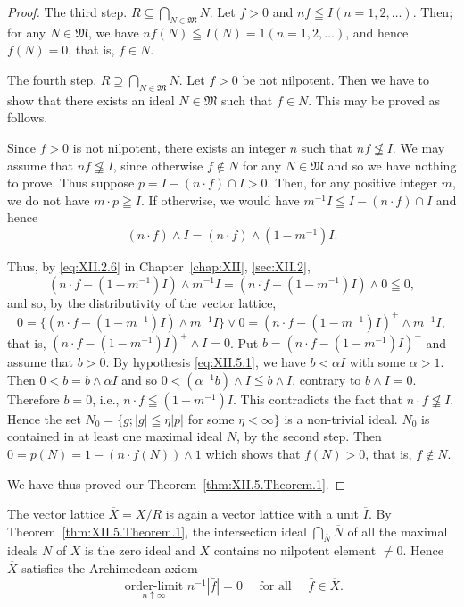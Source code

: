\begin{proof}
The third step. $R \subseteq \bigcap\limits_{N \in \mathfrak{M}} N$. Let $f > 0$ and $nf \leqq I (n = 1, 2, \ldots)$. Then; for any $N \in \mathfrak{M}$, we have $nf(N) \leqq I(N) = 1 (n = 1, 2, \ldots)$, and hence $f(N) = 0$, that is, $f \in N$. 

The fourth step. $R \supseteq \bigcap\limits_{N \in \mathfrak{M}} N$. Let $f > 0$ be not nilpotent. Then we have to show that there exists an ideal $N \in \mathfrak{M}$ such that $f \bar{\in} N$. This may be proved as follows. 

Since $f > 0$ is not nilpotent, there exists an integer $n$ such that $nf \not\leqq I$. We may assume that $nf \not\leqq I$, since otherwise $f \not\in N$ for any $N \in \mathfrak{M}$ and so we have nothing to prove. Thus suppose $p = I - (n \cdot f) \cap I > 0$. Then, for any positive integer $m$, we do not have $m \cdot p \geqq I$. If otherwise, we would have $m^{-1}I \leqq I - (n \cdot f) \cap I$ and hence 
\[
(n \cdot f) \wedge I = (n \cdot f) \wedge (1 - m ^{-1}) I.
\]

Thus, by \eqref{eq:XII.2.6} in Chapter~\ref{chap:XII}, \ref{sec:XII.2}, 
\[
(n \cdot f - (1 - m ^{-1}) I) \wedge m ^{-1} I = (n \cdot f - (1 - m ^{-1}) I) \wedge 0 \leqq 0,
\]
and so, by the distributivity of the vector lattice, 
\[
0 = \{(n \cdot f - (1 - m ^{-1}) I) \wedge m ^{-1} I \} \vee 0 = (n \cdot f - (1 - m ^{-1}) I) ^{+} \wedge m ^{-1} I,
\]
that is, $(n \cdot f - (1 - m^{-1}) I)^{+} \wedge I = 0$. Put $b = (n \cdot f - (1 - m^{-1}) I)^{+}$ and assume that $b > 0$. By hypothesis \eqref{eq:XII.5.1}, we have $b < \alpha I$ with some $\alpha > 1$. Then $0 < b = b \wedge \alpha I$ and so $0 < (\alpha^{-1} b) \wedge I \leqq b \wedge I$, contrary to $b \wedge I = 0$. Therefore $b = 0$, i.e., $n \cdot f \leqq (1 - m^{-1}) I$. This contradicts the fact that $n \cdot f \not\leqq I$. Hence the set $N_{0} = \{g; |g| \leqq \eta |p|$ for some $\eta < \infty\}$ is a non-trivial ideal. $N_{0}$ is contained in at least one maximal ideal $N$, by the second step. Then $0 = p(N) = 1 - (n \cdot f(N)) \wedge 1$ which shows that $f(N) > 0$, that is, $f \not\in N$. 

We have thus proved our Theorem~\ref{thm:XII.5.Theorem.1}.
\end{proof} 

The vector lattice $\overline{X} = X / R$ is again a vector lattice with a unit $\overline{I}$. By Theorem~\ref{thm:XII.5.Theorem.1}, the intersection ideal $\bigcap\limits_{\overline{N}} \overline{N}$ of all the maximal ideals $\overline{N}$ of $\overline{X}$ is the zero ideal and $\overline{X}$ contains no nilpotent element $\neq 0$. Hence $\overline{X}$ satisfies the Archimedean axiom 
\begin{equation}\label{eq:XII.5.5}
\underset {n \uparrow \infty} {\text{ order-limit }} n ^{-1} | \bar {f} | = 0 \quad \text{ for all } \quad \bar {f} \in \overline {{X}}.
\end{equation}

